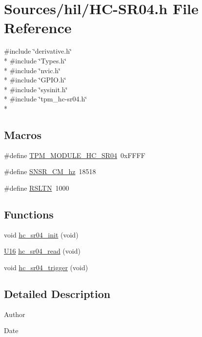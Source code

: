 \hypertarget{_h_c-_s_r04_8h}{}\section{Sources/hil/\+H\+C-\/\+S\+R04.h File Reference}
\label{_h_c-_s_r04_8h}
{\ttfamily \#include \char`\"{}derivative.\+h\char`\"{}}\\*
{\ttfamily \#include \char`\"{}Types.\+h\char`\"{}}\\*
{\ttfamily \#include \char`\"{}nvic.\+h\char`\"{}}\\*
{\ttfamily \#include \char`\"{}G\+P\+I\+O.\+h\char`\"{}}\\*
{\ttfamily \#include \char`\"{}sysinit.\+h\char`\"{}}\\*
{\ttfamily \#include \char`\"{}tpm\+\_\+hc-\/sr04.\+h\char`\"{}}\\*
\subsection*{Macros}
\begin{DoxyCompactItemize}
\item 
\#define \hyperlink{_h_c-_s_r04_8h_a6bb158e28450d26df9b05389b19fa28d}{T\+P\+M\+\_\+\+M\+O\+D\+U\+L\+E\+\_\+\+H\+C\+\_\+\+S\+R04}~0x\+F\+F\+FF
\item 
\#define \hyperlink{_h_c-_s_r04_8h_a42870839300c77ad5fb33e288ec6825e}{S\+N\+S\+R\+\_\+C\+M\+\_\+hz}~18518
\item 
\#define \hyperlink{_h_c-_s_r04_8h_adceb57dbad104ccbabb20f547f7bf96e}{R\+S\+L\+TN}~1000
\end{DoxyCompactItemize}
\subsection*{Functions}
\begin{DoxyCompactItemize}
\item 
void \hyperlink{_h_c-_s_r04_8h_aeeb99876e51267cb0eb34b8aeadee08b}{hc\+\_\+sr04\+\_\+init} (void)
\item 
\hyperlink{_types_8h_adf928e51a60dba0df29d615401cc55a8}{U16} \hyperlink{_h_c-_s_r04_8h_a35ee97390c578d1ae3cc173abcbd4ff3}{hc\+\_\+sr04\+\_\+read} (void)
\item 
void \hyperlink{_h_c-_s_r04_8h_aa781766c52781b5d7ca4838019d40dfa}{hc\+\_\+sr04\+\_\+trigger} (void)
\end{DoxyCompactItemize}


\subsection{Detailed Description}
\begin{DoxyAuthor}{Author}

\end{DoxyAuthor}
\begin{DoxyDate}{Date}

\end{DoxyDate}


